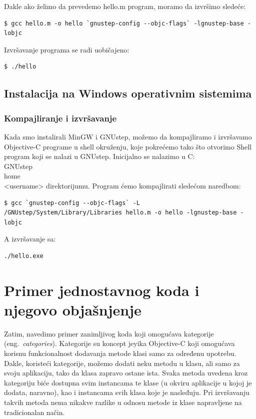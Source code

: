 \documentclass[a4paper]{article}
\begin{document}
{{Dakle ako želimo da prevedemo hello.m program, moramo da izvršimo sledeće:
\begin{lstlisting}[frame=single]
$ gcc hello.m -o hello `gnustep-config --objc-flags` -lgnustep-base -lobjc
\end{lstlisting}
Izvršavanje programa se radi uobičajeno:
\begin{lstlisting}[frame=single]
$ ./hello
\end{lstlisting}

\subsection{Instalacija na Windows operativnim sistemima}
\subsubsection{Kompajliranje i izvršavanje}
Kada smo instalirali MinGW i GNUstep, možemo da kompajliramo i izvršavamo Objective-C programe u shell okruženju, koje pokrećemo tako što otvorimo Shell program koji se nalazi u GNUstep.
Inicijalno se nalazimo u C:\\GNUstep\\home\\<username> direktorijumu.
Program ćemo kompajlirati sledećom naredbom:
\begin{lstlisting}[frame=single]
$ gcc `gnustep-config --objc-flags` -L /GNUstep/System/Library/Libraries hello.m -o hello -lgnustep-base -lobjc
\end{lstlisting}
A izvršavanje sa:
\begin{lstlisting}[frame=single]
./hello.exe
\end{lstlisting}
\section{Primer jednostavnog koda i njegovo objašnjenje}
\label{sec:primer}
Zatim, navedimo primer zanimljivog koda koji omogućava kategorije (eng.~{\em categories}). Kategorije su koncept jeyika Objective-C koji omogućava korisnu funkcionalnost dodavanja metode klasi samo za određenu upotrebu. Dakle, koristeći kategorije, možemo dodati neku metodu u klasu, ali samo za svoju aplikaciju, tako da klasa zapravo ostane ista. Svaka metoda uvedena kroz kategoriju biće dostupna svim instancama te klase (u okviru aplikacije u kojoj je dodata, naravno), kao i instancama svih klasa koje je nasleđuju. Pri izvršavanju takvih metoda nema nikakve razlike u odnosu metode iz klase napravljene na tradicionalan način.


}}
\end{document}
